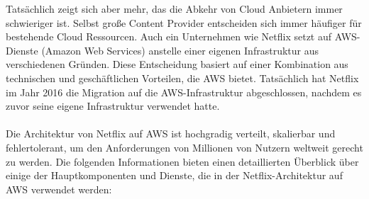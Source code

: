 Tatsächlich zeigt sich aber mehr, das die Abkehr von Cloud Anbietern immer schwieriger ist. Selbst große Content Provider entscheiden sich immer häufiger für bestehende Cloud Ressourcen. Auch ein Unternehmen wie Netflix setzt auf AWS-Dienste (Amazon Web Services) anstelle einer eigenen Infrastruktur aus verschiedenen Gründen. Diese Entscheidung basiert auf einer Kombination aus technischen und geschäftlichen Vorteilen, die AWS bietet. Tatsächlich hat Netflix im Jahr 2016 die Migration auf die AWS-Infrastruktur abgeschlossen, nachdem es zuvor seine eigene Infrastruktur verwendet hatte. 
\\\\
Die Architektur von Netflix auf AWS ist hochgradig verteilt, skalierbar und fehlertolerant, um den Anforderungen von Millionen von Nutzern weltweit gerecht zu werden. Die folgenden Informationen bieten einen detaillierten Überblick über einige der Hauptkomponenten und Dienste, die in der Netflix-Architektur auf AWS verwendet werden:
